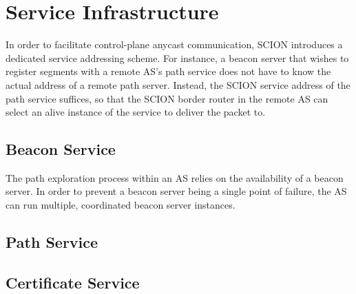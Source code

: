 \section{Service Infrastructure}
In order to facilitate control-plane anycast communication, SCION introduces a dedicated service addressing scheme. For instance, a beacon server that wishes to register segments with a remote AS's path service does not have to know the actual address of a remote path server. Instead, the SCION service address of the path service suffices, so that the SCION border router in the remote AS can select an alive instance of the service to deliver the packet to.

\subsection{Beacon Service}
The path exploration process within an AS relies on the availability of a beacon server. In order to prevent a beacon server being a single point of failure, the AS can run multiple, coordinated beacon server instances.

\subsection{Path Service}

\subsection{Certificate Service}